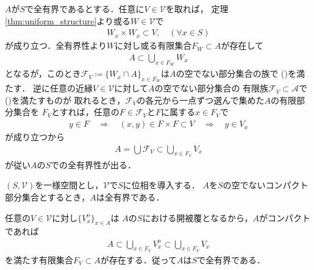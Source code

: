 	\begin{prf}
		$A$が$S$で全有界であるとする．任意に$V \in \mathscr{V}$を取れば，
		定理\ref{thm:uniform_structure}より或る$W \in \mathscr{V}$で
		\begin{align}
			W_x \times W_x \subset V,\quad (\forall x \in S)
		\end{align}
		が成り立つ．全有界性より$W$に対し或る有限集合$F_W \subset A$が存在して
		\begin{align}
			A \subset \bigcup_{x \in F_W} W_x
		\end{align}
		となるが，このとき$\mathscr{F}_V \coloneqq
		\{W_x \cap A\}_{x \in F_W}$は$A$の空でない部分集合の族で
		()を満たす．
		逆に任意の近縁$V \in \mathscr{V}$に対して$A$の空でない部分集合の
		有限族$\mathscr{F}_V \subset \mathscr{A}$で
		()を満たすものが
		取れるとき，$\mathscr{F}_V$の各元から一点ずつ選んで集めた$A$の有限部分集合を
		$F_V$とすれば，任意の$F \in \mathscr{F}_V$と$F$に属する$x \in F_V$で
		\begin{align}
			y \in F \quad \Longrightarrow \quad
			(x,y) \in F \times F \subset V \quad \Longrightarrow \quad
			y \in V_x
		\end{align}
		が成り立つから
		\begin{align}
			A = \bigcup \mathscr{F}_V \subset \bigcup_{x \in F_V} V_x
		\end{align}
		が従い$A$の$S$での全有界性が出る．
		\QED
	\end{prf}
	
	\begin{screen}
		\begin{thm}[コンパクトなら全有界]\label{thm:compact_then_totally_bounded}
			$(S,\mathscr{V})$を一様空間とし，$\mathscr{V}$で$S$に位相を導入する．
			$A$を$S$の空でないコンパクト部分集合とするとき，$A$は全有界である．
		\end{thm}
	\end{screen}
	
	\begin{prf}
		任意の$V \in \mathscr{V}$に対し$\{V_x^{\mathrm{o}}\}_{x \in A}$は
		$A$の$S$における開被覆となるから，$A$がコンパクトであれば
		\begin{align}
			A \subset \bigcup_{x \in F_V} V_x^{\mathrm{o}} 
			\subset \bigcup_{x \in F_V} V_x
		\end{align}
		を満たす有限集合$F_V \subset A$が存在する．従って$A$は$S$で全有界である．
		\QED
	\end{prf}
	
